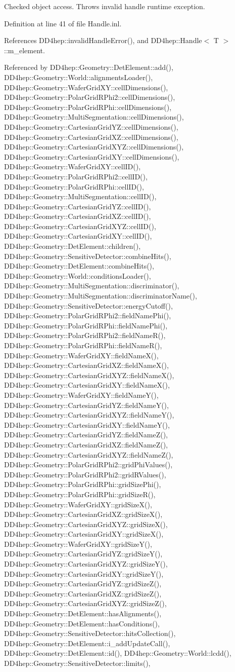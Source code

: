 Checked object access. Throws invalid handle runtime exception. 

Definition at line 41 of file Handle.inl.

References DD4hep::invalidHandleError(), and DD4hep::Handle$<$ T $>$::m\_\-element.

Referenced by DD4hep::Geometry::DetElement::add(), DD4hep::Geometry::World::alignmentsLoader(), DD4hep::Geometry::WaferGridXY::cellDimensions(), DD4hep::Geometry::PolarGridRPhi2::cellDimensions(), DD4hep::Geometry::PolarGridRPhi::cellDimensions(), DD4hep::Geometry::MultiSegmentation::cellDimensions(), DD4hep::Geometry::CartesianGridYZ::cellDimensions(), DD4hep::Geometry::CartesianGridXZ::cellDimensions(), DD4hep::Geometry::CartesianGridXYZ::cellDimensions(), DD4hep::Geometry::CartesianGridXY::cellDimensions(), DD4hep::Geometry::WaferGridXY::cellID(), DD4hep::Geometry::PolarGridRPhi2::cellID(), DD4hep::Geometry::PolarGridRPhi::cellID(), DD4hep::Geometry::MultiSegmentation::cellID(), DD4hep::Geometry::CartesianGridYZ::cellID(), DD4hep::Geometry::CartesianGridXZ::cellID(), DD4hep::Geometry::CartesianGridXYZ::cellID(), DD4hep::Geometry::CartesianGridXY::cellID(), DD4hep::Geometry::DetElement::children(), DD4hep::Geometry::SensitiveDetector::combineHits(), DD4hep::Geometry::DetElement::combineHits(), DD4hep::Geometry::World::conditionsLoader(), DD4hep::Geometry::MultiSegmentation::discriminator(), DD4hep::Geometry::MultiSegmentation::discriminatorName(), DD4hep::Geometry::SensitiveDetector::energyCutoff(), DD4hep::Geometry::PolarGridRPhi2::fieldNamePhi(), DD4hep::Geometry::PolarGridRPhi::fieldNamePhi(), DD4hep::Geometry::PolarGridRPhi2::fieldNameR(), DD4hep::Geometry::PolarGridRPhi::fieldNameR(), DD4hep::Geometry::WaferGridXY::fieldNameX(), DD4hep::Geometry::CartesianGridXZ::fieldNameX(), DD4hep::Geometry::CartesianGridXYZ::fieldNameX(), DD4hep::Geometry::CartesianGridXY::fieldNameX(), DD4hep::Geometry::WaferGridXY::fieldNameY(), DD4hep::Geometry::CartesianGridYZ::fieldNameY(), DD4hep::Geometry::CartesianGridXYZ::fieldNameY(), DD4hep::Geometry::CartesianGridXY::fieldNameY(), DD4hep::Geometry::CartesianGridYZ::fieldNameZ(), DD4hep::Geometry::CartesianGridXZ::fieldNameZ(), DD4hep::Geometry::CartesianGridXYZ::fieldNameZ(), DD4hep::Geometry::PolarGridRPhi2::gridPhiValues(), DD4hep::Geometry::PolarGridRPhi2::gridRValues(), DD4hep::Geometry::PolarGridRPhi::gridSizePhi(), DD4hep::Geometry::PolarGridRPhi::gridSizeR(), DD4hep::Geometry::WaferGridXY::gridSizeX(), DD4hep::Geometry::CartesianGridXZ::gridSizeX(), DD4hep::Geometry::CartesianGridXYZ::gridSizeX(), DD4hep::Geometry::CartesianGridXY::gridSizeX(), DD4hep::Geometry::WaferGridXY::gridSizeY(), DD4hep::Geometry::CartesianGridYZ::gridSizeY(), DD4hep::Geometry::CartesianGridXYZ::gridSizeY(), DD4hep::Geometry::CartesianGridXY::gridSizeY(), DD4hep::Geometry::CartesianGridYZ::gridSizeZ(), DD4hep::Geometry::CartesianGridXZ::gridSizeZ(), DD4hep::Geometry::CartesianGridXYZ::gridSizeZ(), DD4hep::Geometry::DetElement::hasAlignments(), DD4hep::Geometry::DetElement::hasConditions(), DD4hep::Geometry::SensitiveDetector::hitsCollection(), DD4hep::Geometry::DetElement::i\_\-addUpdateCall(), DD4hep::Geometry::DetElement::id(), DD4hep::Geometry::World::lcdd(), DD4hep::Geometry::SensitiveDetector::limits(), 